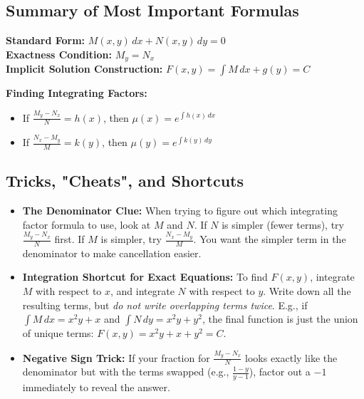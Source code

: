 \documentclass[11pt]{article}
\begin{document}
\subsection{Summary of Most Important Formulas}
\begin{mdframed}[backgroundcolor=gray!10]
\textbf{Standard Form:} $M(x,y) \, dx + N(x,y) \, dy = 0$ \\
\textbf{Exactness Condition:} $M_y = N_x$ \\
\textbf{Implicit Solution Construction:} $F(x,y) = \int M \, dx + g(y) = C$

\textbf{Finding Integrating Factors:}
\begin{itemize}
    \item If $\frac{M_y - N_x}{N} = h(x)$, then $\mu(x) = e^{\int h(x) \, dx}$
    \item If $\frac{N_x - M_y}{M} = k(y)$, then $\mu(y) = e^{\int k(y) \, dy}$
\end{itemize}
\end{mdframed}

\subsection{Tricks, "Cheats", and Shortcuts}
\begin{itemize}
    \item \textbf{The Denominator Clue:} When trying to figure out which integrating factor formula to use, look at $M$ and $N$. If $N$ is simpler (fewer terms), try $\frac{M_y - N_x}{N}$ first. If $M$ is simpler, try $\frac{N_x - M_y}{M}$. You want the simpler term in the denominator to make cancellation easier.
    \item \textbf{Integration Shortcut for Exact Equations:} To find $F(x,y)$, integrate $M$ with respect to $x$, and integrate $N$ with respect to $y$. Write down all the resulting terms, but \emph{do not write overlapping terms twice}. E.g., if $\int M \, dx = x^2y + x$ and $\int N \, dy = x^2y + y^2$, the final function is just the union of unique terms: $F(x,y) = x^2y + x + y^2 = C$. 
    \item \textbf{Negative Sign Trick:} If your fraction for $\frac{M_y - N_x}{N}$ looks exactly like the denominator but with the terms swapped (e.g., $\frac{1-y}{y-1}$), factor out a $-1$ immediately to reveal the answer.
\end{itemize}
\end{document}
